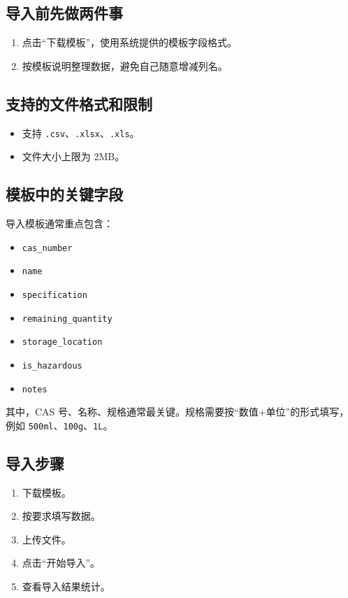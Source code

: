 \documentclass[12pt,a4paper]{ctexart}
\begin{document}
\subsection{导入前先做两件事}
\begin{enumerate}
  \item 点击“下载模板”，使用系统提供的模板字段格式。
  \item 按模板说明整理数据，避免自己随意增减列名。
\end{enumerate}

\subsection{支持的文件格式和限制}
\begin{itemize}
  \item 支持 \texttt{.csv}、\texttt{.xlsx}、\texttt{.xls}。
  \item 文件大小上限为 2MB。
\end{itemize}

\subsection{模板中的关键字段}
导入模板通常重点包含：
\begin{itemize}
  \item \texttt{cas\_number}
  \item \texttt{name}
  \item \texttt{specification}
  \item \texttt{remaining\_quantity}
  \item \texttt{storage\_location}
  \item \texttt{is\_hazardous}
  \item \texttt{notes}
\end{itemize}

其中，CAS 号、名称、规格通常最关键。规格需要按“数值+单位”的形式填写，例如 \texttt{500ml}、\texttt{100g}、\texttt{1L}。

\subsection{导入步骤}
\begin{enumerate}
  \item 下载模板。
  \item 按要求填写数据。
  \item 上传文件。
  \item 点击“开始导入”。
  \item 查看导入结果统计。
\end{enumerate}
\end{document}
